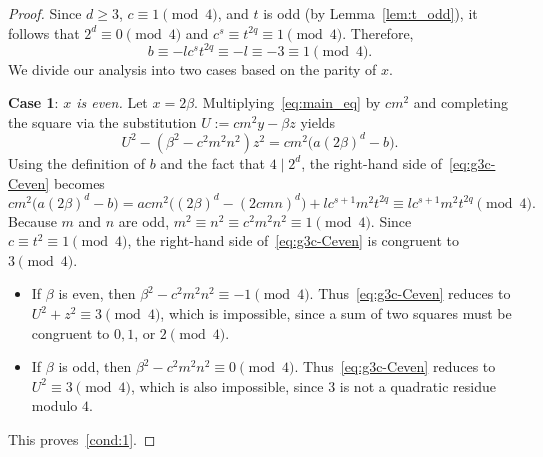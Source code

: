 \documentclass[11pt,a4paper]{amsart}
\theoremstyle{plain}
\theoremstyle{definition}
\begin{document}
\begin{proof}
Since $d \ge 3$, $c \equiv 1 \pmod 4$, and $t$ is odd (by Lemma~\ref{lem:t_odd}), it follows that $2^d \equiv 0 \pmod 4$ and $c^s \equiv t^{2q} \equiv 1 \pmod 4$. Therefore,
\begin{equation}\label{eq:g3c-prelim}
b \equiv -lc^{s}t^{2q} \equiv -l \equiv -3\equiv 1 \pmod{4}.
\end{equation}
We divide our analysis into two cases based on the parity of $x$.

\medskip
\noindent\textbf{Case 1}: \textit{$x$ is even.}\quad
Let $x = 2\beta$. Multiplying~\eqref{eq:main_eq} by $cm^{2}$ and completing the square via the substitution $U := cm^{2}y - \beta z$ yields
\begin{equation}\label{eq:g3c-Ceven}
U^{2} - (\beta^{2}-c^{2}m^{2}n^{2})z^{2} = cm^{2}\bigl(a(2\beta)^{d}-b\bigr).
\end{equation}
Using the definition of $b$ and the fact that $4 \mid 2^{d}$, the right-hand side of~\eqref{eq:g3c-Ceven} becomes
\[
cm^{2}\bigl(a(2\beta)^{d}-b\bigr) = acm^{2}\bigl((2\beta)^{d}-(2cmn)^{d}\bigr) + lc^{s+1}m^{2}t^{2q} \equiv lc^{s+1}m^{2}t^{2q} \pmod{4}.
\]
Because $m$ and $n$ are odd, $m^2 \equiv n^2 \equiv c^{2}m^{2}n^{2} \equiv 1 \pmod{4}$. Since $c \equiv t^2\equiv 1 \pmod 4$, the right-hand side of~\eqref{eq:g3c-Ceven} is congruent to $3 \pmod 4$. 
\begin{itemize}
    \item If $\beta$ is even, then $\beta^{2} - c^{2}m^{2}n^{2} \equiv -1 \pmod 4$. Thus~\eqref{eq:g3c-Ceven} reduces to $U^{2} + z^{2} \equiv 3 \pmod 4$, which is impossible, since a sum of two squares must be congruent to $0, 1$, or $2 \pmod 4$.
    \item If $\beta$ is odd, then $\beta^{2} - c^{2}m^{2}n^{2} \equiv 0 \pmod 4$. Thus~\eqref{eq:g3c-Ceven} reduces to $U^{2} \equiv 3 \pmod 4$, which is also impossible, since $3$ is not a quadratic residue modulo $4$.
\end{itemize}
This proves~\ref{cond:1}.


\end{proof}
\end{document}
